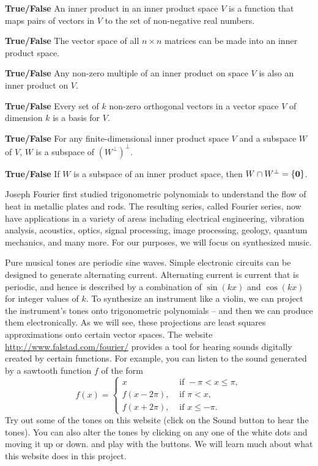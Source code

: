 	\item \textbf{True/False} An inner product in an inner product space $V$ is a function that maps pairs of vectors in $V$ to the set of non-negative real numbers. 
	\item \textbf{True/False} The vector space of all $n \times n$ matrices can be made into an inner product space.  
	\item \textbf{True/False} Any non-zero multiple of an inner product on space $V$ is also an inner product on $V$.
  \item \textbf{True/False} Every set of $k$ non-zero orthogonal vectors in a vector space $V$ of dimension $k$ is a basis for $V$. 
	\item \textbf{True/False} For any finite-dimensional inner product space $V$ and a subspace $W$ of $V$, $W$ is a subspace of $(W^\perp)^\perp$.
	\item \textbf{True/False} If $W$ is a subspace of an inner product space, then $W\cap W^\perp = \{\mathbf{0}\}$.
	\ea    
	  

\ee


Joseph Fourier first studied trigonometric polynomials to understand the flow of heat in metallic plates and rods. The resulting series, called Fourier series, now have applications in a variety of areas including  electrical engineering, vibration  analysis, acoustics, optics, signal processing, image processing, geology, quantum mechanics, and many more. For our purposes, we will focus on synthesized music.

Pure musical tones are periodic sine waves. Simple electronic circuits can be designed to generate alternating current. Alternating current is current that is periodic, and hence is described by a combination of $\sin(kx)$ and $\cos(kx)$ for integer values of $k$. To synthesize an instrument like a violin, we can project the instrument's tones onto trigonometric polynomials -- and then we can produce them electronically. As we will see, these projections are least squares approximations onto certain vector spaces.
The website \url{http://www.falstad.com/fourier/} provides a tool for hearing sounds digitally created by certain functions. For example, you can listen to the sound generated by a sawtooth function $f$ of the form
\[f(x) = \begin{cases}
x &\text{ if } -\pi < x \leq \pi, \\
f(x-2\pi), 	& \text{ if } \pi < x, \\	
f(x+2\pi), 	& \text{ if } x \leq -\pi.
\end{cases}\]
Try out some of the tones on this website (click on the Sound button to hear the tones). You can also alter the tones by clicking on any one of the white dots and moving it up or down.  and play with the buttons.  We will learn much about what this website does in this project.

